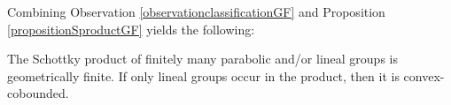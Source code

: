 %
%
%
%
%

Combining Observation \ref{observationclassificationGF} and Proposition \ref{propositionSproductGF} yields the following:

\begin{corollary}
\label{corollaryschottkyGF}
The Schottky product of finitely many parabolic and/or lineal groups is geometrically finite. If only lineal groups occur in the product, then it is convex-cobounded.
\end{corollary}

